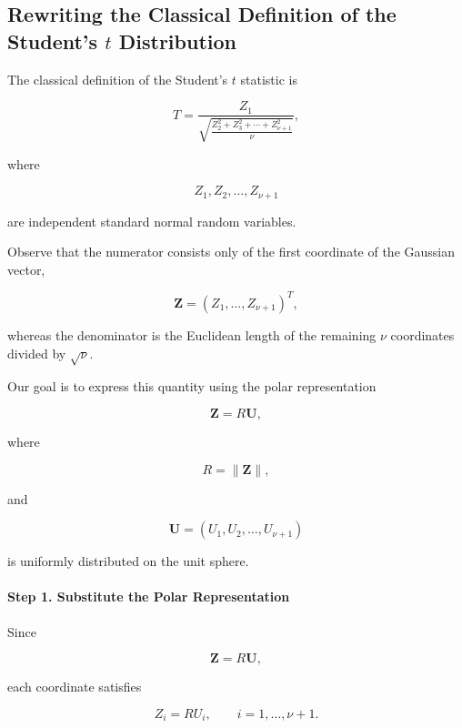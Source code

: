 \documentclass[11pt]{article}
\begin{document}
	\begin{mdframed}[
		linewidth=0.8pt,
		roundcorner=6pt,
		backgroundcolor=gray!5,
		linecolor=gray!60,
		innertopmargin=10pt,
		innerbottommargin=10pt,
		innerleftmargin=10pt,
		innerrightmargin=10pt
		]
		
		\subsection*{Rewriting the Classical Definition of the Student's $t$ Distribution}
		
		The classical definition of the Student's $t$ statistic is
		
		\[
		T
		=
		\frac{Z_1}
		{\sqrt{
				\frac{
					Z_2^2+Z_3^2+\cdots+Z_{\nu+1}^2
				}{\nu}
		}},
		\]
		
		where
		
		\[
		Z_1,Z_2,\ldots,Z_{\nu+1}
		\]
		
		are independent standard normal random variables.
		
		Observe that the numerator consists only of the first coordinate of the
		Gaussian vector,
		
		\[
		\mathbf Z
		=
		(Z_1,\ldots,Z_{\nu+1})^T,
		\]
		
		whereas the denominator is the Euclidean length of the remaining
		$\nu$ coordinates divided by $\sqrt{\nu}$.
		
		Our goal is to express this quantity using the polar representation
		
		\[
		\mathbf Z
		=
		R\mathbf U,
		\]
		
		where
		
		\[
		R=\|\mathbf Z\|,
		\]
		
		and
		
		\[
		\mathbf U
		=
		(U_1,U_2,\ldots,U_{\nu+1})
		\]
		
		is uniformly distributed on the unit sphere.
		
		\vspace{0.3cm}
		
		\paragraph{Step 1. Substitute the Polar Representation}
		
		Since
		
		\[
		\mathbf Z=R\mathbf U,
		\]
		
		each coordinate satisfies
		
		\[
		Z_i=RU_i,
		\qquad
		i=1,\ldots,\nu+1.
		\]
		

\end{mdframed}
\end{document}
